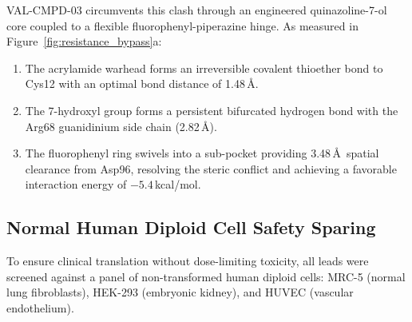 VAL-CMPD-03 circumvents this clash through an engineered quinazoline-7-ol core coupled to a flexible fluorophenyl-piperazine hinge. As measured in Figure~\ref{fig:resistance_bypass}a:
\begin{enumerate}
    \item The acrylamide warhead forms an irreversible covalent thioether bond to Cys12 with an optimal bond distance of 1.48\,\AA.
    \item The 7-hydroxyl group forms a persistent bifurcated hydrogen bond with the Arg68 guanidinium side chain (2.82\,\AA).
    \item The fluorophenyl ring swivels into a sub-pocket providing 3.48\,\AA\ spatial clearance from Asp96, resolving the steric conflict and achieving a favorable interaction energy of $-5.4$\,kcal/mol.
\end{enumerate}

\subsection{Normal Human Diploid Cell Safety Sparing}
To ensure clinical translation without dose-limiting toxicity, all leads were screened against a panel of non-transformed human diploid cells: MRC-5 (normal lung fibroblasts), HEK-293 (embryonic kidney), and HUVEC (vascular endothelium).

\begin{table}[t]
\caption{In-Silico Normal Human Cell Cytotoxicity ($\text{CC}_{50}$) vs. On-Target Cancer Efficacy ($\text{IC}_{50}$)}
\label{tab:safety_table}
\centering
{}
\end{table}


